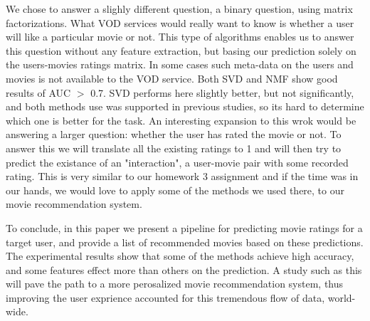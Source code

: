We chose to answer a slighly different question, a binary question, using matrix factorizations. What VOD services would really want to know is whether a user will like a particular movie or not. This type of algorithms enables us to answer this question without any feature extraction, but basing our prediction solely on the users-movies ratings matrix. In some cases such meta-data on the users and movies is not available to the VOD service. Both SVD and NMF show good results of AUC $>$ 0.7. SVD performs here slightly better, but not significantly, and both methods use was supported in previous studies, so its hard to determine which one is better for the task. An interesting expansion to this wrok would be answering a larger question: whether the user has rated the movie or not. To answer this we will translate all the existing ratings to 1 and will then try to predict the existance of an "interaction", a user-movie pair with some recorded rating. This is very similar to our homework 3 assignment and if the time was in our hands, we would love to apply some of the methods we used there, to our movie recommendation system.

To conclude, in this paper we present a pipeline for predicting movie ratings for a target user, and provide a list of recommended movies based on these predictions. The experimental results show that some of the methods achieve high accuracy, and some features effect more than others on the prediction. A study such as this will pave the path to a more perosalized movie recommendation system, thus improving the user exprience accounted for this tremendous flow of data, world-wide.
